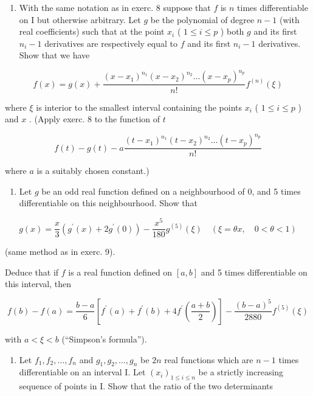 \begin{enumerate}
\def\labelenumi{\arabic{enumi})}
\setcounter{enumi}{8}
\tightlist
\item
  With the same notation as in exerc. 8 suppose that \(f\) is \(n\) times differentiable on I but otherwise arbitrary. Let \(g\) be the polynomial of degree \(n - 1\) (with real coefficients) such that at the point \(x_{i}\) ( \(1 \leqslant i \leqslant p\) ) both \(g\) and its first \(n_{i} - 1\) derivatives are respectively equal to \(f\) and its first \(n_{i} - 1\) derivatives. Show that we have
\end{enumerate}

\[
f (x) = g (x) + \frac {(x - x _ {1}) ^ {n _ {1}} (x - x _ {2}) ^ {n _ {2}} \dots (x - x _ {p}) ^ {n _ {p}}}{n !} f ^ {(n)} (\xi)
\]

where \(\xi\) is interior to the smallest interval containing the points \(x_{i}\) ( \(1 \leqslant i \leqslant p\) ) and \(x\) . (Apply exerc. 8 to the function of \(t\)

\[
f (t) - g (t) - a \frac {(t - x _ {1}) ^ {n _ {1}} (t - x _ {2}) ^ {n _ {2}} \dots (t - x _ {p}) ^ {n _ {p}}}{n !}
\]

where \(a\) is a suitably chosen constant.)

\begin{enumerate}
\def\labelenumi{\arabic{enumi})}
\setcounter{enumi}{9}
\tightlist
\item
  Let \(g\) be an odd real function defined on a neighbourhood of 0, and 5 times differentiable on this neighbourhood. Show that
\end{enumerate}

\[
g (x) = \frac {x}{3} \left(g ^ {\prime} (x) + 2 g ^ {\prime} (0)\right) - \frac {x ^ {5}}{1 8 0} g ^ {(5)} (\xi) \quad (\xi = \theta x, \quad 0 <   \theta <   1)
\]

(same method as in exerc. 9).

Deduce that if \(f\) is a real function defined on \([a, b]\) and 5 times differentiable on this interval, then

\[
f (b) - f (a) = \frac {b - a}{6} \left[ f ^ {\prime} (a) + f ^ {\prime} (b) + 4 f ^ {\prime} \left(\frac {a + b}{2}\right) \right] - \frac {(b - a) ^ {5}}{2 8 8 0} f ^ {(5)} (\xi)
\]

with \(a < \xi < b\) (``Simpson's formula'').

\begin{enumerate}
\def\labelenumi{\arabic{enumi})}
\setcounter{enumi}{10}
\tightlist
\item
  Let \(f_{1}, f_{2}, \ldots, f_{n}\) and \(g_{1}, g_{2}, \ldots, g_{n}\) be \(2n\) real functions which are \(n - 1\) times differentiable on an interval I. Let \((x_{i})_{1 \leqslant i \leqslant n}\) be a strictly increasing sequence of points in I. Show that the ratio of the two determinants
\end{enumerate}

